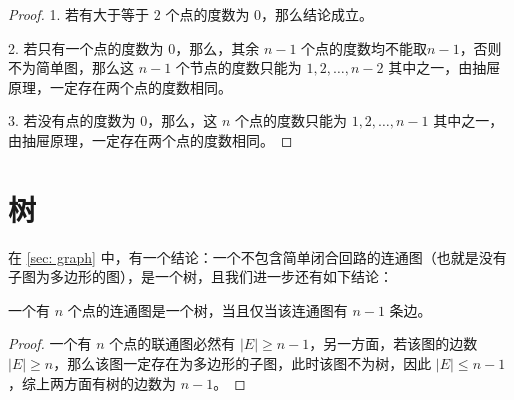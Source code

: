 \documentclass[cn,hazy,sakura,14pt,normal]{elegantnote}
\begin{document}
\begin{proof}
    1. 若有大于等于 $2$ 个点的度数为 $0$，那么结论成立。
    
    2. 若只有一个点的度数为 $0$，那么，其余 $n - 1$ 个点的度数均不能取$n - 1$，否则不为简单图，那么这 $n - 1$ 个节点的度数只能为 $1, 2, \dots, n - 2$ 其中之一，由抽屉原理，一定存在两个点的度数相同。

    3. 若没有点的度数为 $0$，那么，这 $n$ 个点的度数只能为 $1, 2, \dots, n - 1$ 其中之一，由抽屉原理，一定存在两个点的度数相同。
\end{proof}

\section{树}

在 \ref{sec: graph} 中，有一个结论：一个不包含简单闭合回路的连通图（也就是没有子图为多边形的图），是一个树，且我们进一步还有如下结论：

\begin{theorem}
    一个有 $n$ 个点的连通图是一个树，当且仅当该连通图有 $n - 1$ 条边。
\end{theorem}

\begin{proof}
    一个有 $n$ 个点的联通图必然有 $\left| E \right| \geq n - 1$，另一方面，若该图的边数 $\left| E \right| \geq n$，那么该图一定存在为多边形的子图，此时该图不为树，因此 $\left| E \right| \leq n - 1$，综上两方面有树的边数为 $n - 1$。
\end{proof}

\newpage

\nocite{*}
\printbibliography[heading=bibintoc, title=\ebibname]
\end{document}
